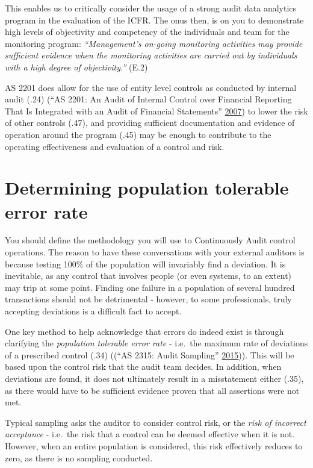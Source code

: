 \documentclass[
]{book}
\begin{document}
This enables us to critically consider the usage of a strong audit data analytics program in the evaluation of the ICFR. The onus then, is on you to demonstrate high levels of objectivity and competency of the individuals and team for the monitoring program: \emph{``Management's on-going monitoring activities may provide sufficient evidence when the monitoring activities are carried out by individuals with a high degree of objectivity.''} (E.2)

AS 2201 does allow for the use of entity level controls as conducted by internal audit (.24) (``AS 2201: An Audit of Internal Control over Financial Reporting That Is Integrated with an Audit of Financial Statements'' \protect\hyperlink{ref-pcaob-as2201}{2007}) to lower the risk of other controls (.47), and providing sufficient documentation and evidence of operation around the program (.45) may be enough to contribute to the operating effectiveness and evaluation of a control and risk.

\hypertarget{determining-population-tolerable-error-rate}{%
\section{Determining population tolerable error rate}\label{determining-population-tolerable-error-rate}}

You should define the methodology you will use to Continuously Audit control operations. The reason to have these conversations with your external auditors is because testing 100\% of the population will invariably find a deviation. It is inevitable, as any control that involves people (or even systems, to an extent) may trip at some point. Finding one failure in a population of several hundred transactions should not be detrimental - however, to some professionals, truly accepting deviations is a difficult fact to accept.

One key method to help acknowledge that errors do indeed exist is through clarifying the \emph{population tolerable error rate} - i.e.~the maximum rate of deviations of a prescribed control (.34) ((``AS 2315: Audit Sampling'' \protect\hyperlink{ref-pcaob-as2315}{2015})). This will be based upon the control risk that the audit team decides. In addition, when deviations are found, it does not ultimately result in a misstatement either (.35), as there would have to be sufficient evidence proven that all assertions were not met.

Typical sampling asks the auditor to consider control risk, or the \emph{risk of incorrect acceptance} - i.e.~the risk that a control can be deemed effective when it is not. However, when an entire population is considered, this risk effectively reduces to zero, as there is no sampling conducted.
\end{document}
